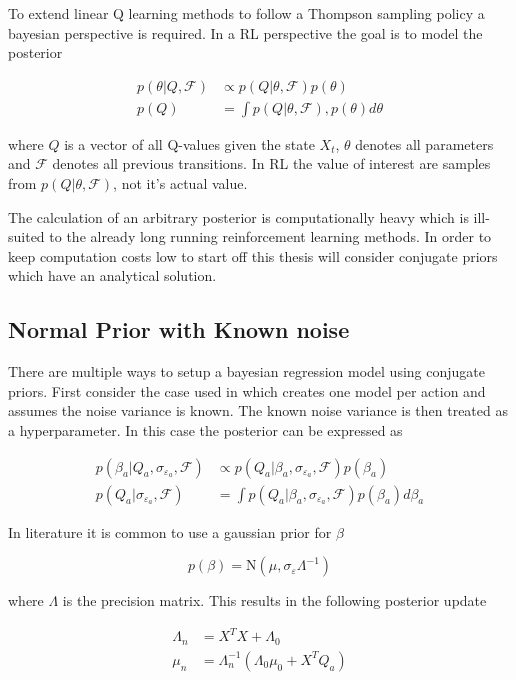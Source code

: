 To extend linear Q learning methods to follow a Thompson sampling policy a bayesian perspective is required. In a RL perspective the goal is to model the posterior

\begin{align*}
p(\theta |Q, \mathcal{F}) &\propto p(Q| \theta, \mathcal{F})p(\theta) \\
p(Q) &= \int p(Q|\theta, \mathcal{F}), p(\theta) d\theta
\end{align*}

where $Q$ is a vector of all Q-values given the state $X_t$, $\theta$ denotes all parameters and $\mathcal{F}$ denotes all previous transitions. In RL the value of interest are samples from $p(Q|\theta, \mathcal{F})$, not it's actual value.

The calculation of an arbitrary posterior is computationally heavy which is ill-suited to the already long running reinforcement learning methods. In order to keep computation costs low to start off this thesis will consider conjugate priors which have an analytical solution.

\subsection{Normal Prior with Known noise}

There are multiple ways to setup a bayesian regression model using conjugate priors. First consider the case used in \cite{azziz_2018} which creates one model per action and assumes the noise variance is known. The known noise variance is then treated as a hyperparameter. In this case the posterior can be expressed as 

\begin{align*}
    p(\beta_a |Q_a, \sigma_{\varepsilon_a}, \mathcal{F}) &\propto p(Q_a| \beta_a, \sigma_{\varepsilon_a}, \mathcal{F})p(\beta_a) \\
    p(Q_a|\sigma_{\varepsilon_a}, \mathcal{F}) &= \int p(Q_a|\beta_a, \sigma_{\varepsilon_a}, \mathcal{F}) p(\beta_a)d\beta_a
\end{align*}

In literature it is common to use a gaussian prior for $\beta$

$$
p(\beta) = \text{N}(\mu, \sigma_\varepsilon\Lambda^{-1}) 
$$

where $\Lambda$ is the precision matrix. This results in the following posterior update

\begin{align*}
	\Lambda_n & = X^TX + \Lambda_0 \\
	\mu_n     & = \Lambda_n^{-1}(\Lambda_0\mu_0 + X^TQ_a)
\end{align*}

